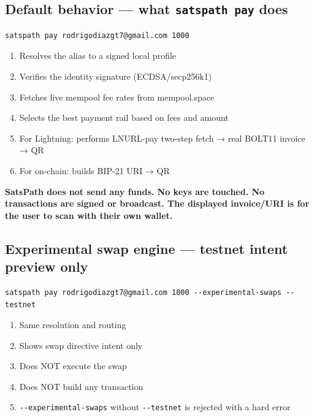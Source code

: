\documentclass[
]{article}
\providecommand{\tightlist}{%
  \setlength{\itemsep}{0pt}\setlength{\parskip}{0pt}}
\begin{document}
\hypertarget{default-behavior-what-satspath-pay-does}{%
\subsection{\texorpdfstring{Default behavior --- what
\texttt{satspath\ pay}
does}{Default behavior --- what satspath pay does}}\label{default-behavior-what-satspath-pay-does}}

\begin{verbatim}
satspath pay rodrigodiazgt7@gmail.com 1000
\end{verbatim}

\begin{enumerate}
\def\labelenumi{\arabic{enumi}.}
\tightlist
\item
  Resolves the alias to a signed local profile
\item
  Verifies the identity signature (ECDSA/secp256k1)
\item
  Fetches live mempool fee rates from mempool.space
\item
  Selects the best payment rail based on fees and amount
\item
  For Lightning: performs LNURL-pay two-step fetch → real BOLT11 invoice
  → QR
\item
  For on-chain: builds BIP-21 URI → QR
\end{enumerate}

\textbf{SatsPath does not send any funds. No keys are touched. No
transactions are signed or broadcast. The displayed invoice/URI is for
the user to scan with their own wallet.}

\hypertarget{experimental-swap-engine-testnet-intent-preview-only}{%
\subsection{Experimental swap engine --- testnet intent preview
only}\label{experimental-swap-engine-testnet-intent-preview-only}}

\begin{verbatim}
satspath pay rodrigodiazgt7@gmail.com 1000 --experimental-swaps --testnet
\end{verbatim}

\begin{enumerate}
\def\labelenumi{\arabic{enumi}.}
\tightlist
\item
  Same resolution and routing
\item
  Shows swap directive intent only
\item
  Does NOT execute the swap
\item
  Does NOT build any transaction
\item
  \texttt{-\/-experimental-swaps} without \texttt{-\/-testnet} is
  rejected with a hard error
\end{enumerate}
\end{document}

